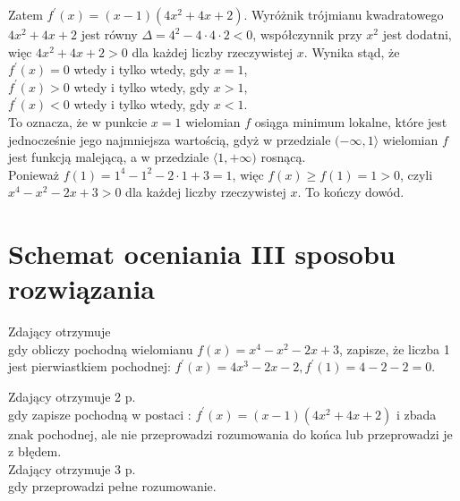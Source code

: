 \documentclass[10pt]{article}
\begin{document}
Zatem $f^{\prime}(x)=(x-1)\left(4 x^{2}+4 x+2\right)$. Wyróżnik trójmianu kwadratowego $4 x^{2}+4 x+2$ jest równy $\Delta=4^{2}-4 \cdot 4 \cdot 2<0$, współczynnik przy $x^{2}$ jest dodatni, więc $4 x^{2}+4 x+2>0$ dla każdej liczby rzeczywistej $x$. Wynika stąd, że\\
$f^{\prime}(x)=0$ wtedy i tylko wtedy, gdy $x=1$,\\
$f^{\prime}(x)>0$ wtedy i tylko wtedy, gdy $x>1$,\\
$f^{\prime}(x)<0$ wtedy i tylko wtedy, gdy $x<1$.\\
To oznacza, że w punkcie $x=1$ wielomian $f$ osiąga minimum lokalne, które jest jednocześnie jego najmniejsza wartością, gdyż w przedziale $(-\infty, 1\rangle$ wielomian $f$ jest funkcją malejącą, a w przedziale $\langle 1,+\infty)$ rosnącą.\\
Ponieważ $f(1)=1^{4}-1^{2}-2 \cdot 1+3=1$, więc $f(x) \geq f(1)=1>0$, czyli $x^{4}-x^{2}-2 x+3>0$ dla każdej liczby rzeczywistej $x$. To kończy dowód.

\section*{Schemat oceniania III sposobu rozwiązania}
Zdający otrzymuje\\
gdy obliczy pochodną wielomianu $f(x)=x^{4}-x^{2}-2 x+3$, zapisze, że liczba 1 jest pierwiastkiem pochodnej: $f^{\prime}(x)=4 x^{3}-2 x-2, f^{\prime}(1)=4-2-2=0$.

Zdający otrzymuje 2 p.\\
gdy zapisze pochodną w postaci : $f^{\prime}(x)=(x-1)\left(4 x^{2}+4 x+2\right)$ i zbada znak pochodnej, ale nie przeprowadzi rozumowania do końca lub przeprowadzi je z błędem.\\
Zdający otrzymuje 3 p.\\
gdy przeprowadzi pełne rozumowanie.
\end{document}
